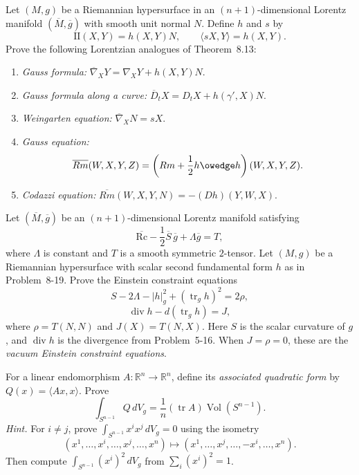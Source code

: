 \begin{exercise}
\label{prob:lorentz-hypersurface-formulas}

Let $(M,g)$ be a Riemannian hypersurface in an $(n+1)$-dimensional Lorentz
manifold $(\overline M,\overline g)$ with smooth unit normal $N$. Define
$h$ and $s$ by
\[
\mathrm{II}(X,Y)=h(X,Y)N,
\qquad
\langle sX,Y\rangle=h(X,Y).
\]
Prove the following Lorentzian analogues of Theorem~8.13:
\begin{enumerate}
\item[(a)] \emph{Gauss formula:}
$\overline\nabla_XY=\nabla_XY+h(X,Y)N$.
\item[(b)] \emph{Gauss formula along a curve:}
$\overline D_tX=D_tX+h(\gamma',X)N$.
\item[(c)] \emph{Weingarten equation:}
$\overline\nabla_XN=sX$.
\item[(d)] \emph{Gauss equation:}
\[
\overline{Rm}(W,X,Y,Z)
=\left(Rm+\frac12h\owedge h\right)(W,X,Y,Z).
\]
\item[(e)] \emph{Codazzi equation:}
$\overline{Rm}(W,X,Y,N)=-(Dh)(Y,W,X)$.
\end{enumerate}
\end{exercise}

\begin{exercise}
\label{prob:lorentz-einstein-field-equation}

Let $(\overline M,\overline g)$ be an $(n+1)$-dimensional Lorentz manifold
satisfying
\[
\overline{\mathrm{Rc}}-\frac12\overline S\,\overline g
+\Lambda\overline g=T,
\]
where $\Lambda$ is constant and $T$ is a smooth symmetric $2$-tensor. Let
$(M,g)$ be a Riemannian hypersurface with scalar second fundamental form $h$
as in Problem~8-19. Prove the Einstein constraint equations
\[
S-2\Lambda-|h|_g^2+(\operatorname{tr}_gh)^2=2\rho,
\]
\[
\operatorname{div}h-d(\operatorname{tr}_gh)=J,
\]
where $\rho=T(N,N)$ and $J(X)=T(N,X)$. Here $S$ is the scalar curvature of
$g$, and $\operatorname{div}h$ is the divergence from Problem~5-16. When
$J=\rho=0$, these are the \emph{vacuum Einstein constraint equations}.
\end{exercise}

\begin{exercise}
\label{prob:associated-quadratic-form}

For a linear endomorphism $A:\mathbb R^n\to\mathbb R^n$, define its
\emph{associated quadratic form} by $Q(x)=\langle Ax,x\rangle$. Prove
\[
\int_{S^{n-1}}Q\,dV_g
=\frac1n(\operatorname{tr}A)\operatorname{Vol}(S^{n-1}).
\]
\emph{Hint.} For $i\neq j$, prove
$\int_{S^{n-1}}x^ix^j\,dV_g=0$ using the isometry
\[
(x^1,\ldots,x^i,\ldots,x^j,\ldots,x^n)
\longmapsto
(x^1,\ldots,x^j,\ldots,-x^i,\ldots,x^n).
\]
Then compute $\int_{S^{n-1}}(x^i)^2\,dV_g$ from
$\sum_i(x^i)^2=1$.
\end{exercise}

